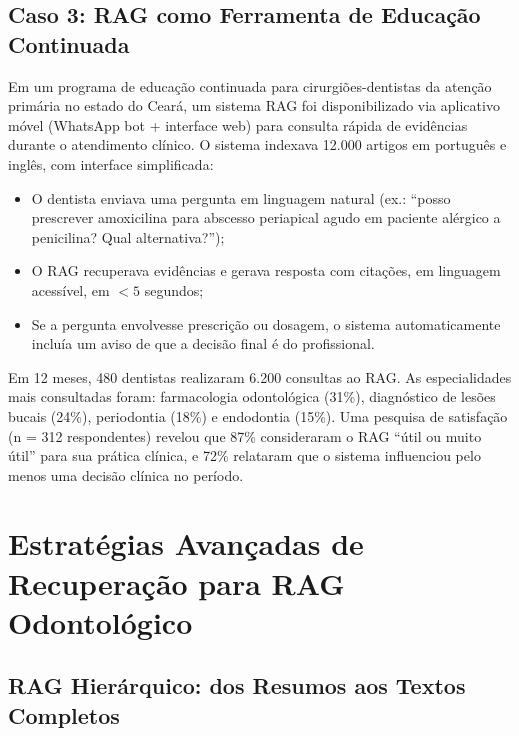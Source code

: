 
\subsection{Caso 3: RAG como Ferramenta de Educação Continuada}

Em um programa de educação continuada para cirurgiões-dentistas da atenção primária no estado do Ceará, um sistema RAG foi disponibilizado via aplicativo móvel (WhatsApp bot + interface web) para consulta rápida de evidências durante o atendimento clínico. O sistema indexava 12.000 artigos em português e inglês, com interface simplificada:
\begin{itemize}
    \item O dentista enviava uma pergunta em linguagem natural (ex.: ``posso prescrever amoxicilina para abscesso periapical agudo em paciente alérgico a penicilina? Qual alternativa?'');\item O RAG recuperava evidências e gerava resposta com citações, em linguagem acessível, em $<5$ segundos;
    \item Se a pergunta envolvesse prescrição ou dosagem, o sistema automaticamente incluía um aviso de que a decisão final é do profissional.
\end{itemize}

Em 12 meses, 480 dentistas realizaram 6.200 consultas ao RAG. As especialidades mais consultadas foram: farmacologia odontológica (31\%), diagnóstico de lesões bucais (24\%), periodontia (18\%) e endodontia (15\%). Uma pesquisa de satisfação (n = 312 respondentes) revelou que 87\% consideraram o RAG ``útil ou muito útil'' para sua prática clínica, e 72\% relataram que o sistema influenciou pelo menos uma decisão clínica no período.

\section{Estratégias Avançadas de Recuperação para RAG Odontológico}

\subsection{RAG Hierárquico: dos Resumos aos Textos Completos}

